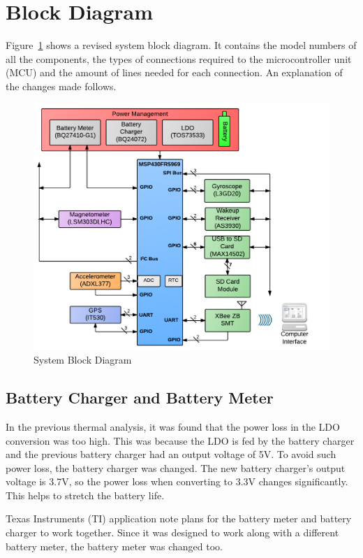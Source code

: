 \section{Block Diagram}

Figure~\ref{fig:blockDiagram} shows a revised system block diagram. It contains the model numbers of all the components, the types of connections required to the microcontroller unit (MCU) and the amount of lines needed for each connection.  An explanation of the changes made follows.

\begin{figure}[H]
\centering
	\includegraphics[width=\textwidth]{img/blockDiagram}
	\caption{System Block Diagram \label{fig:blockDiagram}}
\end{figure}

\subsection{Battery Charger and Battery Meter}

In the previous thermal analysis, it was found that the power loss in the LDO conversion was too high. This was because the LDO is fed by the battery charger and the previous battery charger had an output voltage of 5V. To avoid such power loss, the battery charger was changed.  The new battery charger's output voltage is 3.7V, so the power loss when converting to 3.3V changes significantly. This helps to stretch the battery life.  

Texas Instruments (TI) application note plans for the battery meter and battery charger to work together.  Since it was designed to work along with a different battery meter, the battery meter was changed too.

